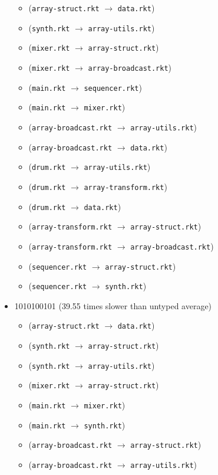 \documentclass{article}
\newcommand{\mono}[1]{\texttt{#1}}
\begin{document}
\begin{itemize}
\begin{itemize}
  \item (\mono{array-struct.rkt} $\rightarrow$ \mono{data.rkt})
  \item (\mono{synth.rkt} $\rightarrow$ \mono{array-utils.rkt})
  \item (\mono{mixer.rkt} $\rightarrow$ \mono{array-struct.rkt})
  \item (\mono{mixer.rkt} $\rightarrow$ \mono{array-broadcast.rkt})
  \item (\mono{main.rkt} $\rightarrow$ \mono{sequencer.rkt})
  \item (\mono{main.rkt} $\rightarrow$ \mono{mixer.rkt})
  \item (\mono{array-broadcast.rkt} $\rightarrow$ \mono{array-utils.rkt})
  \item (\mono{array-broadcast.rkt} $\rightarrow$ \mono{data.rkt})
  \item (\mono{drum.rkt} $\rightarrow$ \mono{array-utils.rkt})
  \item (\mono{drum.rkt} $\rightarrow$ \mono{array-transform.rkt})
  \item (\mono{drum.rkt} $\rightarrow$ \mono{data.rkt})
  \item (\mono{array-transform.rkt} $\rightarrow$ \mono{array-struct.rkt})
  \item (\mono{array-transform.rkt} $\rightarrow$ \mono{array-broadcast.rkt})
  \item (\mono{sequencer.rkt} $\rightarrow$ \mono{array-struct.rkt})
  \item (\mono{sequencer.rkt} $\rightarrow$ \mono{synth.rkt})
  \end{itemize}
\item 1010100101 (39.55 times slower than untyped average)
  \begin{itemize}
  \item (\mono{array-struct.rkt} $\rightarrow$ \mono{data.rkt})
  \item (\mono{synth.rkt} $\rightarrow$ \mono{array-struct.rkt})
  \item (\mono{synth.rkt} $\rightarrow$ \mono{array-utils.rkt})
  \item (\mono{mixer.rkt} $\rightarrow$ \mono{array-struct.rkt})
  \item (\mono{main.rkt} $\rightarrow$ \mono{mixer.rkt})
  \item (\mono{main.rkt} $\rightarrow$ \mono{synth.rkt})
  \item (\mono{array-broadcast.rkt} $\rightarrow$ \mono{array-struct.rkt})
  \item (\mono{array-broadcast.rkt} $\rightarrow$ \mono{array-utils.rkt})

\end{itemize}
\end{itemize}
\end{document}

